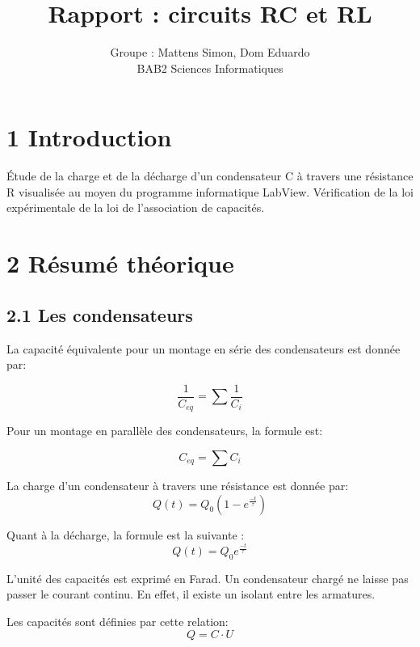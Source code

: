 \documentclass{report}
\author{Groupe : Mattens Simon, Dom Eduardo\\ BAB2 Sciences Informatiques}
\title{Rapport : circuits RC et RL}
\makeatletter
\def\maketitle{%
  \null
  \thispagestyle{empty}%
  \vfill
  \begin{center}\leavevmode
    \normalfont
    {\LARGE \@title\par}%
    \vskip 1cm
    {\Large \@author\par}%
    \vskip 1cm
    {\Large \@date\par}%
  \end{center}%
  \vfill
  \null
  \newpage
  }
\makeatother
\begin{document}
\maketitle

\section*{1 Introduction}
\hspace*{0.5cm}

\'Etude de la charge et de la d\'echarge d'un condensateur C \`a travers une r\'esistance R visualis\'ee au moyen du programme informatique LabView. V\'erification de la loi exp\'erimentale de la loi de l'association de capacit\'es.

\section*{2 R\'esum\'e th\'eorique}
\subsection*{2.1 Les condensateurs}
\hspace*{0.5cm}
La capacit\'e \'equivalente pour un montage en s\'erie des condensateurs est donn\'ee par:

\begin{equation}
   \frac{1}{C_{eq}} =  \sum{\frac{1}{C_{i}}}
\end{equation}

Pour un montage en parall\`ele des condensateurs, la formule est:

\begin{equation}
    C_{eq} =\sum{C_{i}}
\end{equation}

La charge d'un condensateur \`a travers une r\'esistance est donn\'ee par:
\begin{equation}
    Q(t) = Q_{0}(1-e^{\frac{-t}{\tau}})
\end{equation}

Quant \`a la d\'echarge, la formule est la suivante :
\begin{equation}
    Q(t) = Q_{0}e^{\frac{-t}{\tau}}
\end{equation}

L'unit\'e des capacit\'es est exprim\'e en Farad. Un condensateur charg\'e ne laisse pas passer le courant continu. En effet, il existe un isolant entre les armatures.

Les capacit\'es sont d\'efinies par cette relation:
\begin{equation}
    Q = C\cdot U
\end{equation}
\end{document}
